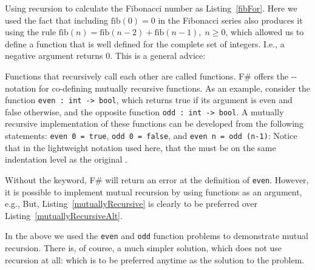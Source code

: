 Using recursion to calculate the Fibonacci number as Listing~\ref{fibFor}.
%
%
Here we used the fact that including $\text{fib}(0)=0$ in the Fibonacci series also produces it using the rule $\text{fib}(n)=\text{fib}(n-2)+\text{fib}(n-1),\; n\geq 0$, which allowed us to define a function that is well defined for the complete set of integers. I.e., a negative argument returns 0. This is a general advice:  

Functions that recursively call each other are called  functions. F\# offers the \mbox{--} notation for co-defining mutually recursive functions. As an example, consider the function \mbox{\lstinline!even : int -> bool!}, which returns true if its argument is even and false otherwise, and the opposite function \mbox{\lstinline!odd : int -> bool!}. A mutually recursive implementation of these functions can be developed from the following statements: \mbox{\lstinline!even 0 = true!}, \mbox{\lstinline!odd 0 = false!}, and \mbox{\lstinline!even n = odd (n-1)!}: 
%
%
Notice that in the lightweight notation used here, that the  must be on the same indentation level as the original .

Without the  keyword, F\# will return an error at the definition of \lstinline!even!. However, it is possible to implement mutual recursion by using functions as an argument, e.g.,
%
%
But, Listing~\ref{mutuallyRecursive} is clearly to be preferred over Listing~\ref{mutuallyRecursiveAlt}. 

In the above we used the \lstinline!even! and \lstinline!odd! function problems to demonstrate mutual recursion. There is, of course, a much simpler solution, which does not use recursion at all:
%
%
which is to be preferred anytime as the solution to the problem.

